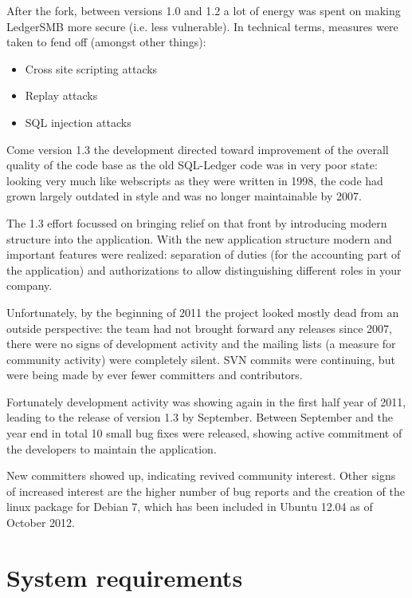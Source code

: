After the fork, between versions 1.0 and 1.2 a lot of energy was spent on
making LedgerSMB more secure (i.e. less vulnerable).  In technical terms,
measures were taken to fend off (amongst other things):

\begin{itemize}
\item Cross site scripting attacks
\item Replay attacks
\item SQL injection attacks
\end{itemize}

Come version 1.3 the development directed toward improvement of the overall
quality of the code base as the old SQL-Ledger code was in very poor state:
looking very much like webscripts as they were written in 1998, the code had
grown largely outdated in style and was no longer maintainable by 2007.

The 1.3 effort focussed on bringing relief on that front by introducing
modern structure into the application.  With the new application structure
modern and important features were realized: separation of duties (for the
accounting part of the application) and authorizations to allow distinguishing
different roles in your company.

Unfortunately, by the beginning of 2011 the project looked mostly dead from
an outside perspective: the team had not brought forward any releases since
2007, there were no signs of development activity and the
mailing lists (a measure for community activity) were
completely silent.  SVN commits were continuing, but were being made by ever 
fewer committers and contributors.

Fortunately development activity was showing again in the first half 
year of 2011,
leading to the release of version 1.3 by September.  Between September and the
year end in total 10 small bug fixes were released, showing active commitment
of the developers to maintain the application.

New committers showed up, indicating revived community interest. Other signs of
increased interest are the higher number of bug reports and the creation of the
linux package for Debian 7, which has been included in Ubuntu 12.04 as of
October 2012.



\section{System requirements}
\label{sec-ledgersmb-system-requirements}

